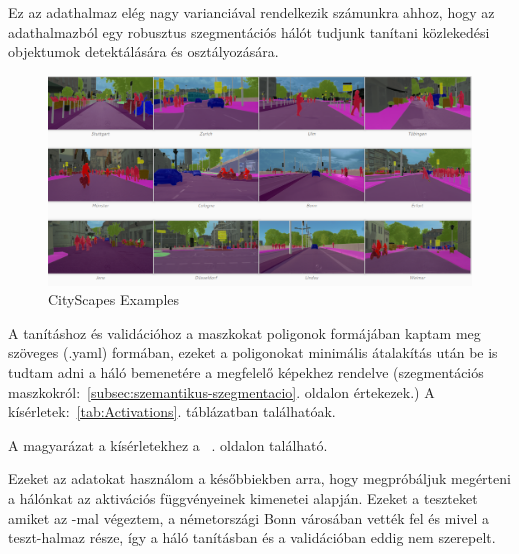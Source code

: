 \documentclass[12pt,oneside,a4paper]{article}
\theoremstyle{remark}
\begin{document}
	Ez az adathalmaz elég nagy varianciával rendelkezik számunkra ahhoz, hogy az adathalmazból egy
	robusztus szegmentációs hálót tudjunk tanítani közlekedési objektumok detektálására és osztályozására.
	
	
	\begin{figure}[ht]
		\centering
		\noindent\includegraphics[width=1\linewidth]{cityscapes}
		\caption{CityScapes Examples}
		\label{fig:CityScapes-Examples}
	\end{figure}
	A tanításhoz és validációhoz a maszkokat poligonok formájában kaptam meg szöveges (.yaml) formában, ezeket a poligonokat
	minimális átalakítás után be is tudtam adni a háló bemenetére a megfelelő képekhez rendelve (szegmentációs
	maszkokról:~\ref{subsec:szemantikus-szegmentacio}. oldalon értekezek.)
	A kísérletek:~\ref{tab:Activations}. táblázatban találhatóak.
	
	A magyarázat a kísérletekhez a ~\pageref{subsec:magyarazat}\label{pageref}.
	oldalon található.
	
	Ezeket az adatokat használom a későbbiekben arra, hogy megpróbáljuk megérteni a hálónkat az aktivációs függvényeinek kimenetei
	alapján.
	Ezeket a teszteket amiket az -mal végeztem, a németországi Bonn városában
	vették fel és mivel a teszt-halmaz része, így a háló tanításban és a validációban eddig nem szerepelt.
\end{document}
